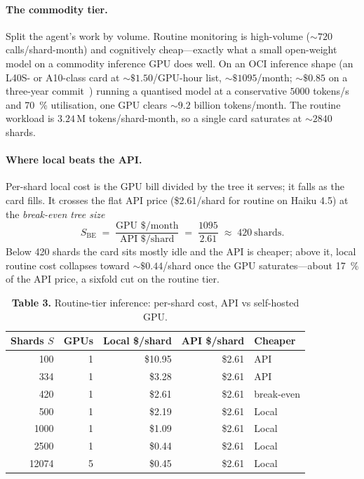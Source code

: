 \documentclass[11pt]{article}
\newcommand{\shards}{S}
\begin{document}
\paragraph{The commodity tier.} Split the agent's work by volume. Routine monitoring is high-volume
($\sim\!\num{720}$ calls/shard-month) and cognitively cheap---exactly what a small open-weight model
on a commodity inference GPU does well. On an OCI inference shape (an L40S- or A10-class card at
$\sim\$1.50$/GPU-hour list, $\sim\$\num{1095}$/month; $\sim\$0.85$ on a three-year
commit~\cite{oci2026}) running a quantised model at a conservative $\num{5000}$ tokens/s and
\SI{70}{\percent} utilisation, one GPU clears $\sim\!\num{9.2}$ billion tokens/month. The routine
workload is $\num{3.24}$\,M tokens/shard-month, so a single card saturates at $\sim\!\num{2840}$
shards.

\paragraph{Where local beats the API.} Per-shard local cost is the GPU bill divided by the tree it
serves; it falls as the card fills. It crosses the flat API price (\$2.61/shard for routine on Haiku
4.5) at the \emph{break-even tree size}
\[
\shards_{\text{BE}} \;=\; \frac{\text{GPU \$/month}}{\text{API \$/shard}}
\;=\; \frac{\num{1095}}{2.61} \;\approx\; \num{420}\ \text{shards}.
\]
Below \num{420} shards the card sits mostly idle and the API is cheaper; above it, local routine cost
collapses toward $\sim\$0.44$/shard once the GPU saturates---about \SI{17}{\percent} of the API
price, a sixfold cut on the routine tier.

\begin{table}[h]
\centering
\caption*{\textbf{Table 3.} Routine-tier inference: per-shard cost, API vs self-hosted GPU.}
\setlength{\tabcolsep}{7pt}
\renewcommand{\arraystretch}{1.12}
\begin{tabular}{@{}rrrrl@{}}
\toprule
Shards $\shards$ & GPUs & Local \$/shard & API \$/shard & Cheaper \\
\midrule
\num{100}   & 1 & \$10.95 & \$2.61 & API \\
\num{334}   & 1 & \$3.28  & \$2.61 & API \\
\num{420}   & 1 & \$2.61  & \$2.61 & break-even \\
\rowcolor{coolrow}\num{500}   & 1 & \$2.19  & \$2.61 & Local \\
\rowcolor{coolrow}\num{1000}  & 1 & \$1.09  & \$2.61 & Local \\
\rowcolor{coolrow}\num{2500}  & 1 & \$0.44  & \$2.61 & Local \\
\rowcolor{coolrow}\num{12074} & 5 & \$0.45  & \$2.61 & Local \\
\bottomrule
\end{tabular}
\end{table}
\end{document}
